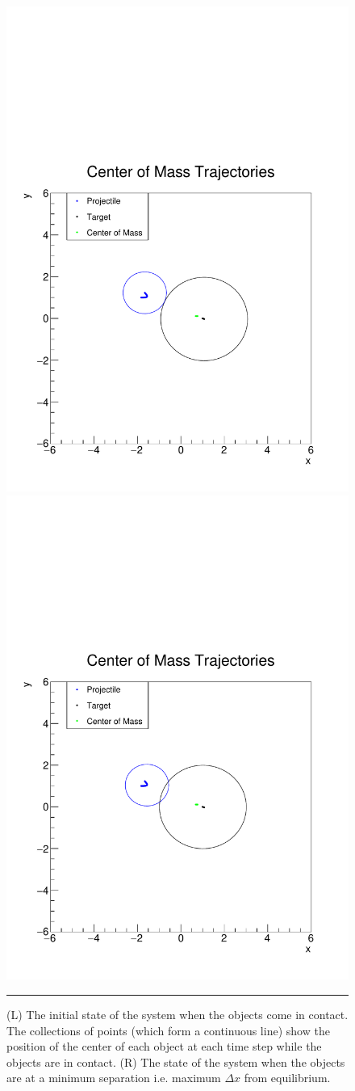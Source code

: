 \documentclass[aps,prl,floatfix,preprint,nofootinbib]{revtex4}
\begin{document}
\begin{figure}[h!]
  \includegraphics[width=.45\textwidth]{plots/default/x_vs_y_with_ellipse.pdf}
  \includegraphics[width=.45\textwidth]{plots/default/x_vs_y_with_ellipse_MS.pdf}
                  {\par\nobreak\rule[9pt]{35em}{0.5pt}\vspace{-5mm}}
                  \caption{(L) The initial state of the system when the objects come in contact. The collections of points (which form a continuous line) show the position of the center of each object at each time step while the objects are in contact. (R) The state of the system when the objects are at a minimum separation i.e. maximum $\Delta x$ from equilibrium.}
                  \label{fig:tracks_default}
\end{figure}
\end{document}
